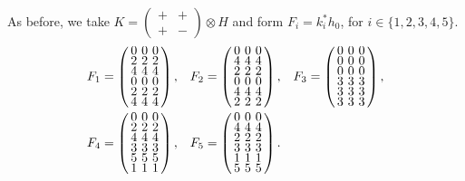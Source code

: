 \documentclass[../../main]{subfiles}
\begin{document}
As before, we take
$
K=\left(
  \begin{smallmatrix}
    +&+\\
    +&-
  \end{smallmatrix}
\right)
\otimes
H
$
and form $F_i=k_i^*h_0$, for $i \in \{1,2,3,4,5\}$.
\begin{align*}
  F_1 &= \left(
        \arraycolsep=1.75pt\def\arraystretch{0.5}
        \begin{array}{ccc}
          0&0&0\\
          2&2&2\\
          4&4&4\\
          0&0&0\\
          2&2&2\\
          4&4&4\\
        \end{array}
        \right),
  &
    F_2 &= \left(
          \arraycolsep=1.75pt\def\arraystretch{0.5}
          \begin{array}{ccc}
            0&0&0\\
            4&4&4\\
            2&2&2\\
            0&0&0\\
            4&4&4\\
            2&2&2\\
          \end{array}
          \right),
  &
    F_3 &= \left(
          \arraycolsep=1.75pt\def\arraystretch{0.5}
          \begin{array}{ccc}
            0&0&0\\
            0&0&0\\
            0&0&0\\
            3&3&3\\
            3&3&3\\
            3&3&3\\
          \end{array}
          \right),
  \\
  F_4 &= \left(
        \arraycolsep=1.75pt\def\arraystretch{0.5}
        \begin{array}{ccc}
          0&0&0\\
          2&2&2\\
          4&4&4\\
          3&3&3\\
          5&5&5\\
          1&1&1\\
        \end{array}
        \right),
  &
    F_5 &= \left(
          \arraycolsep=1.75pt\def\arraystretch{0.5}
          \begin{array}{ccc}
            0&0&0\\
            4&4&4\\
            2&2&2\\
            3&3&3\\
            1&1&1\\
            5&5&5\\
          \end{array}
          \right).
\end{align*}
\end{document}
